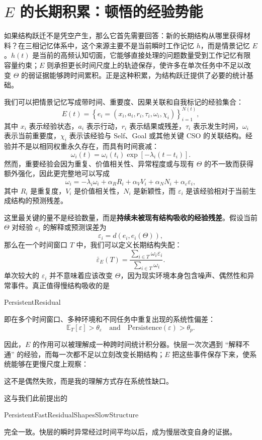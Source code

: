 \section{$E$ 的长期积累：顿悟的经验势能}

如果结构跃迁不是凭空产生，那么它首先需要回答：新的长期结构从哪里获得材料？在三相记忆体系中，这个来源主要不是当前瞬时工作记忆 $h$，而是情景记忆 $E$。$h(t)$ 是当前的高频认知切面，它能够直接处理的问题数量受到工作记忆有限容量约束；$E$ 则承担更长时间尺度上的轨迹保存，使许多在单次任务中不足以改变 $\Theta$ 的弱证据能够跨时间累积。正是这种积累，为结构跃迁提供了必要的统计基础。

我们可以把情景记忆写成带时间、重要度、因果关联和自我标记的经验集合：
\[
E(t)
=
\left\{
e_i=
(x_i,a_i,r_i,\tau_i,\omega_i,\chi_i)
\right\}_{i=1}^{N(t)},
\]
其中 $x_i$ 表示经验状态，$a_i$ 表示行动，$r_i$ 表示结果或残差，$\tau_i$ 表示发生时间，$\omega_i$ 表示当前重要度，$\chi_i$ 表示该经验与 Self、Goal 或其他关键 CSO 的关联结构。经验并不是以相同权重永久存在，而具有时间衰减：
\[
\omega_i(t)
=
\omega_i(t_i)
\exp
\left[
-\lambda_i(t-t_i)
\right].
\]
然而，重要经验会因为重复、价值相关性、异常程度或与现有 $\Theta$ 的不一致而获得额外强化，因此更完整地可以写成
\[
\dot{\omega}_i
=
-\lambda_i\omega_i
+
\alpha_R R_i
+
\alpha_V V_i
+
\alpha_N N_i
+
\alpha_{\varepsilon}\varepsilon_i,
\]
其中 $R_i$ 是重复度，$V_i$ 是价值相关性，$N_i$ 是新颖性，而 $\varepsilon_i$ 是该经验相对于当前生成结构的预测残差。

这里最关键的量不是经验数量，而是\textbf{持续未被现有结构吸收的经验残差}。假设当前 $\Theta$ 对经验 $e_i$ 的解释或预测误差为
\[
\varepsilon_i
=
d\left(
e_i,
\hat e_i(\Theta)
\right),
\]
那么在一个时间窗口 $T$ 中，我们可以定义长期结构失配：
\[
\bar{\varepsilon}_{E}(T)
=
\frac{
\sum_{i\in T}\omega_i\varepsilon_i
}{
\sum_{i\in T}\omega_i
}.
\]
单次较大的 $\varepsilon_i$ 并不意味着应该改变 $\Theta$，因为现实环境本身包含噪声、偶然性和异常事件。真正值得慢结构吸收的是
\begin{statementbox}
PersistentResidual
\end{statementbox}
即在多个时间窗口、多种环境和不同任务中重复出现的系统性偏差：
\[
\mathbb E_T[\varepsilon]
>
\theta_\varepsilon
\quad
\text{and}
\quad
\mathrm{Persistence}(\varepsilon)
>
\theta_p.
\]

因此，$E$ 的作用可以被理解成一种跨时间统计积分器。快层一次次遇到 ``解释不通'' 的经验，而每一次都不足以立刻改变长期结构；$E$ 把这些事件保存下来，使系统能够在更慢尺度上观察：
\begin{statementbox}
这不是偶然失败，而是我的理解方式存在系统性缺口。
\end{statementbox}
这与我们此前提出的
\begin{statementbox}
PersistentFastResidualShapesSlowStructure
\end{statementbox}
完全一致。快层的瞬时异常经过时间平均以后，成为慢层改变自身的证据。


